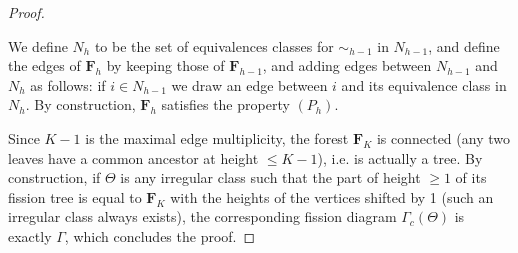 \documentclass[10pt,a4paper]{amsart}
\begin{document}
\begin{proof}
\begin{itemize}
We define $N_h$ to be the set of equivalences classes for $\sim_{h-1}$ in $N_{h-1}$, and define the edges of $\mathbf F_h$ by keeping those of $\mathbf F_{h-1}$, and adding edges between $N_{h-1}$ and $N_h$ as follows: if $i\in N_{h-1}$ we draw an edge between $i$ and its equivalence class in $N_h$. By construction, $\mathbf F_h$ satisfies the property $(P_h)$. 
\end{itemize}

Since $K-1$ is the maximal edge multiplicity, the forest $\mathbf F_K$ is connected (any two leaves have a common ancestor at height $\leq K-1$), i.e. is actually a tree. By construction, if $\Theta$ is any irregular class such that the part of height $\geq 1$ of its fission tree is equal to $\mathbf F_K$ with the heights of the vertices shifted by 1 (such an irregular class always exists), the corresponding fission diagram $\Gamma_c(\Theta)$ is exactly $\Gamma$, which concludes the proof.
\end{proof}
\end{document}
